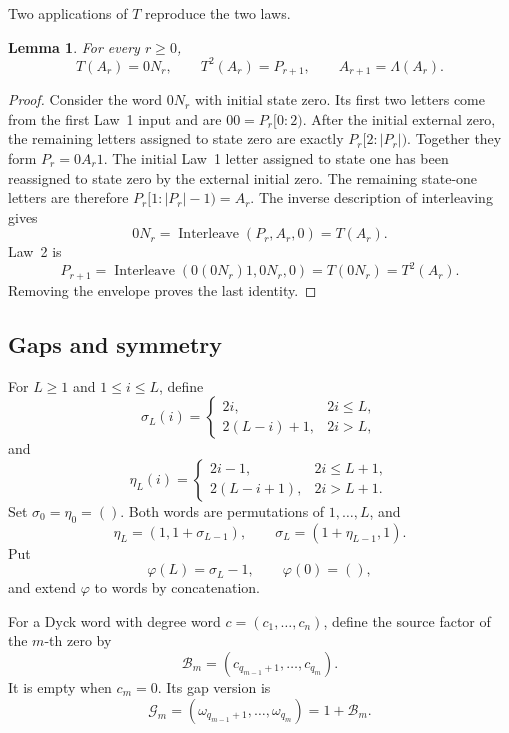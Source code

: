 \documentclass[11pt]{article}
\newtheorem{lemma}[theorem]{Lemma}
\theoremstyle{definition}
\theoremstyle{remark}
\DeclareMathOperator{\Interleave}{Interleave}
\newcommand{\Lam}{\Lambda}
\begin{document}
Two applications of $T$ reproduce the two laws.
\begin{lemma}
\label{lem:normal-form}
For every \(r\geq0\),
\[
 T(A_r)=0N_r,
 \qquad T^2(A_r)=P_{r+1},
 \qquad A_{r+1}=\Lam(A_r).
\]
\end{lemma}

\begin{proof}
Consider the word \(0N_r\) with initial state zero.  Its first two letters
come from the first Law~1 input and are \(00=P_r[0:2)\).  After the initial
external zero, the remaining letters assigned to state zero are exactly
\(P_r[2:|P_r|)\).  Together they form \(P_r=0A_r1\).  The initial Law~1
letter assigned to state one has been reassigned to state zero by the
external initial zero.  The remaining state-one letters are therefore
\(P_r[1:|P_r|-1)=A_r\).  The inverse description of interleaving gives
\[
 0N_r=\Interleave(P_r,A_r,0)=T(A_r).
\]
Law~2 is
\[
 P_{r+1}=\Interleave(0(0N_r)1,0N_r,0)=T(0N_r)=T^2(A_r).
\]
Removing the envelope proves the last identity.
\end{proof}

\subsection{Gaps and symmetry}
\label{sec:gaps-symmetry}

For \(L\geq1\) and \(1\leq i\leq L\), define
\begin{equation}
\label{eq:sigma-gap}
 \sigma_L(i)=
 \begin{cases}
 2i,&2i\leq L,\\
 2(L-i)+1,&2i>L,
 \end{cases}
\end{equation}
and
\begin{equation*}
 \eta_L(i)=
 \begin{cases}
 2i-1,&2i\leq L+1,\\
 2(L-i+1),&2i>L+1.
 \end{cases}
\end{equation*}
Set \(\sigma_0=\eta_0=()\).  Both words are permutations of
\(1,\ldots,L\), and
\begin{equation}
\label{eq:gap-toggle-identities}
 \eta_L=(1,1+\sigma_{L-1}),
 \qquad \sigma_L=(1+\eta_{L-1},1).
\end{equation}
Put
\[
 \varphi(L)=\sigma_L-1,
 \qquad \varphi(0)=(),
\]
and extend \(\varphi\) to words by concatenation.

For a Dyck word with degree word \(c=(c_1,\ldots,c_n)\), define the source
factor of the \(m\)-th zero by
\[
 \mathcal B_m=(c_{q_{m-1}+1},\ldots,c_{q_m}).
\]
It is empty when \(c_m=0\).
Its gap version is
\[
 \mathcal G_m=(\omega_{q_{m-1}+1},\ldots,\omega_{q_m})
 =1+\mathcal B_m.
\]
\end{document}
